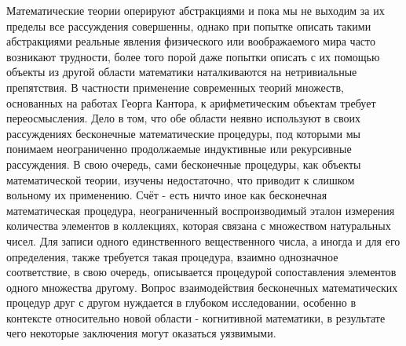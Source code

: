 \documentclass[12pt]{article}
\begin{document}
Математические теории оперируют абстракциями и пока мы не выходим за их пределы все рассуждения совершенны, однако при попытке описать такими абстракциями реальные явления физического или воображаемого мира часто возникают трудности, более того порой даже попытки описать с их помощью объекты из другой области математики наталкиваются на нетривиальные препятствия. В частности применение современных теорий множеств, основанных на работах Георга Кантора, к арифметическим объектам требует переосмысления. Дело в том, что обе области неявно используют в своих рассуждениях бесконечные математические процедуры, под которыми мы понимаем неограниченно продолжаемые индуктивные или рекурсивные рассуждения. В свою очередь, сами бесконечные процедуры, как объекты математической теории, изучены недостаточно, что приводит к слишком вольному их применению. Счёт - есть ничто иное как бесконечная математическая процедура, неограниченный воспроизводимый эталон измерения количества элементов в коллекциях, которая связана с множеством натуральных чисел. Для записи одного единственного вещественного числа, а иногда и для его определения, также требуется такая процедура, взаимно однозначное соответствие, в свою очередь, описывается процедурой сопоставления элементов одного множества другому. Вопрос взаимодействия бесконечных математических процедур друг с другом нуждается в глубоком исследовании, особенно в контексте относительно новой области - когнитивной математики, в результате чего некоторые заключения могут оказаться уязвимыми.
\end{document}
